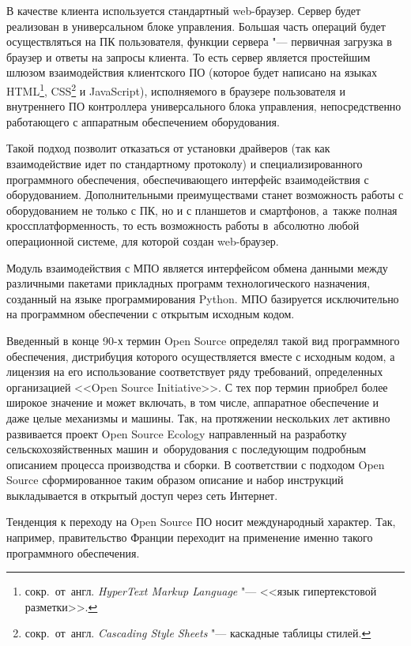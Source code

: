 В качестве клиента используется стандартный \foreignlanguage{english}{web}-браузер. Сервер будет реализован в универсальном блоке управления. Большая часть операций будет осуществляться на ПК пользователя, функции сервера "--- первичная загрузка в браузер и ответы на запросы клиента. То есть сервер является простейшим шлюзом взаимодействия клиентского ПО (которое будет написано на языках \foreignlanguage{english}{HTML}\footnote{сокр.~от~англ. \textit{HyperText Markup Language} "--- <<язык гипертекстовой разметки>>.}, \foreignlanguage{english}{CSS}\footnote{сокр.~от~англ. \textit{Cascading Style Sheets} "--- каскадные таблицы стилей.} и \foreignlanguage{english}{JavaScript}), исполняемого в браузере пользователя и внутреннего ПО контроллера универсального блока управления, непосредственно работающего с аппаратным обеспечением оборудования.

Такой подход позволит отказаться от установки драйверов (так как взаимодействие идет по стандартному протоколу) и специализированного программного обеспечения, обеспечивающего интерфейс взаимодействия с оборудованием. Дополнительными преимуществами станет возможность работы с оборудованием не только с ПК, но и с планшетов и смартфонов, а~также полная кроссплатформенность, то есть возможность работы в~абсолютно любой операционной системе, для которой создан \foreignlanguage{english}{web}-браузер.

Модуль взаимодействия с МПО является интерфейсом обмена данными между различными пакетами прикладных программ технологического назначения, созданный на языке программирования Python. \foreignlanguage{english}{МПО} базируется исключительно на программном обеспечении с открытым исходным кодом.

Введенный в конце 90-х термин Open Source определял такой вид программного обеспечения, дистрибуция которого осуществляется вместе с исходным кодом, а лицензия на его использование соответствует ряду требований, определенных организацией <<Open Source Initiative>>. С тех пор термин приобрел более широкое значение и может включать, в том числе, аппаратное обеспечение и даже целые механизмы и машины. Так, на протяжении нескольких лет активно развивается проект Open Source Ecology направленный на разработку сельскохозяйственных машин и~оборудования с последующим подробным описанием процесса производства и сборки. В соответствии с подходом Open Source сформированное таким образом описание и набор инструкций выкладывается в открытый доступ через сеть Интернет.

Тенденция к переходу на Open Source ПО носит международный характер. Так, например, правительство Франции переходит на применение именно такого программного обеспечения.

